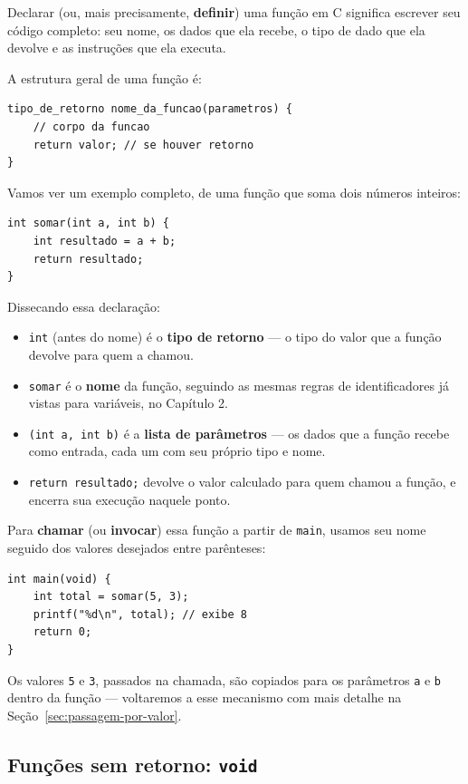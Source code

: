 Declarar (ou, mais precisamente, \textbf{definir}) uma função em C significa escrever seu código completo: seu nome, os dados que ela recebe, o tipo de dado que ela devolve e as instruções que ela executa.

A estrutura geral de uma função é:

\begin{lstlisting}
tipo_de_retorno nome_da_funcao(parametros) {
    // corpo da funcao
    return valor; // se houver retorno
}
\end{lstlisting}

Vamos ver um exemplo completo, de uma função que soma dois números inteiros:

\begin{lstlisting}
int somar(int a, int b) {
    int resultado = a + b;
    return resultado;
}
\end{lstlisting}

Dissecando essa declaração:

\begin{itemize}
    \item \texttt{int} (antes do nome) é o \textbf{tipo de retorno} — o tipo do valor que a função devolve para quem a chamou.
    \item \texttt{somar} é o \textbf{nome} da função, seguindo as mesmas regras de identificadores já vistas para variáveis, no Capítulo 2.
    \item \texttt{(int a, int b)} é a \textbf{lista de parâmetros} — os dados que a função recebe como entrada, cada um com seu próprio tipo e nome.
    \item \texttt{return resultado;} devolve o valor calculado para quem chamou a função, e encerra sua execução naquele ponto.
\end{itemize}

Para \textbf{chamar} (ou \textbf{invocar}) essa função a partir de \texttt{main}, usamos seu nome seguido dos valores desejados entre parênteses:

\begin{lstlisting}
int main(void) {
    int total = somar(5, 3);
    printf("%d\n", total); // exibe 8
    return 0;
}
\end{lstlisting}

Os valores \texttt{5} e \texttt{3}, passados na chamada, são copiados para os parâmetros \texttt{a} e \texttt{b} dentro da função — voltaremos a esse mecanismo com mais detalhe na Seção~\ref{sec:passagem-por-valor}.

\subsection{Funções sem retorno: \texttt{void}}

